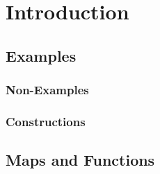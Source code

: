 \chapter{Introduction}

\section{Examples}


\subsection{Non-Examples}

\subsection{Constructions}

\section{Maps and Functions}
